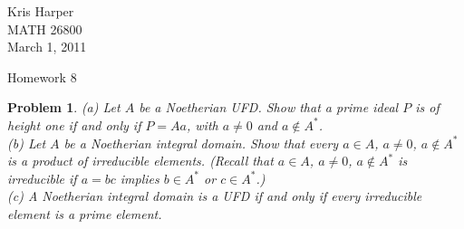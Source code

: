 \documentclass{article}
\newtheorem{problem}{Problem}
\begin{document}
\begin{flushright}
Kris Harper\\

MATH 26800\\

March 1, 2011
\end{flushright}

\begin{center}
Homework 8
\end{center}

\begin{problem}
\label{UFD}
(a) Let $A$ be a Noetherian UFD. Show that a prime ideal $P$ is of height one if and only if $P = Aa$, with $a \neq 0$ and $a \notin A^*$.\\
(b) Let $A$ be a Noetherian integral domain. Show that every $a \in A$, $a \neq 0$, $a \notin A^*$ is a product of irreducible elements. (Recall that $a \in A$, $a \neq 0$, $a \notin A^*$ is irreducible if $a = bc$ implies $b \in A^*$ or $c \in A^*$.)\\
(c) A Noetherian integral domain is a UFD if and only if every irreducible element is a prime element.
\end{problem}
\end{document}

